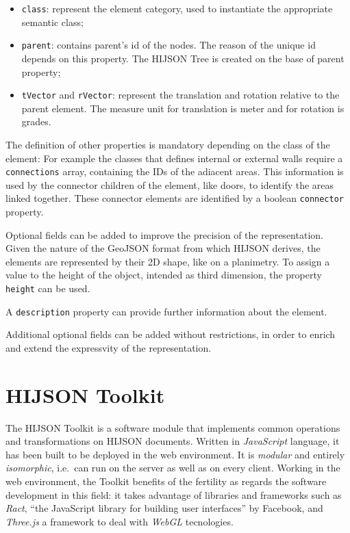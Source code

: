 \documentclass{sig-alternate}
\begin{document}
\begin{itemize}
\itemsep1pt\parskip0pt
\item
  \texttt{class}: represent the element category, used to instantiate
  the appropriate semantic class;
\item
  \texttt{parent}: contains parent's id of the nodes. The reason of the
  unique id depends on this property. The HIJSON Tree is created on the
  base of parent property;
\item
  \texttt{tVector} and \texttt{rVector}: represent the translation and
  rotation relative to the parent element. The measure unit for
  translation is meter and for rotation is grades.
\end{itemize}

The definition of other properties is mandatory depending on the class
of the element: For example the classes that defines internal or
external walls require a \texttt{connections} array, containing the IDs
of the adiacent areas. This information is used by the connector
children of the element, like doors, to identify the areas linked
together. These connector elements are identified by a
boolean \texttt{connector} property.

Optional fields can be added to improve the precision of the
representation. Given the nature of the GeoJSON format from which HIJSON
derives, the elements are represented by their 2D shape, like on a
planimetry. To assign a value to the height of the object, intended as
third dimension, the property \texttt{height} can be used.

A \texttt{description} property can provide further information about
the element.

Additional optional fields can be added without restrictions, in order 
to enrich and extend the expressvity of the representation.

\section{HIJSON Toolkit}\label{hijson-toolkit}

The HIJSON Toolkit is a software module that implements common
operations and transformations on HIJSON documents. Written in
\emph{JavaScript} language, it has been built to be deployed in the web
environment. It is \emph{modular} and entirely \emph{isomorphic},
i.e.~can run on the server as well as on every client. Working in the
web environment, the Toolkit benefits of the fertility as regards the
software development in this field: it takes advantage of libraries and
frameworks such as \emph{Ract}, ``the JavaScript library for building
user interfaces'' by Facebook, and \emph{Three.js} a framework to deal
with \emph{WebGL} tecnologies.
\end{document}
